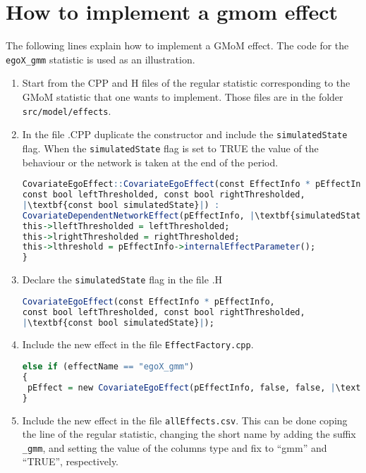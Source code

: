 \documentclass[a4paper,11pt]{article}
\begin{document}
\newpage
\section*{How to implement a gmom effect}
The following lines explain how to implement a GMoM effect. The code for the \texttt{egoX\_gmm} statistic is used as an illustration. 
\begin{enumerate}
	\item Start from the CPP and H files of the regular statistic corresponding to the GMoM statistic that one wants to implement. Those files are in the folder \texttt{src/model/effects}.
	\item In the file .CPP duplicate the constructor and include the \texttt{simulatedState} flag. When the \texttt{simulatedState} flag is set to TRUE the value of the behaviour or the network is taken at the end of the period.
	
\begin{lstlisting}[language=R]
CovariateEgoEffect::CovariateEgoEffect(const EffectInfo * pEffectInfo,
const bool leftThresholded, const bool rightThresholded,
|\textbf{const bool simulatedState}|) :
CovariateDependentNetworkEffect(pEffectInfo, |\textbf{simulatedState}|) {
this->lleftThresholded = leftThresholded;
this->lrightThresholded = rightThresholded;
this->lthreshold = pEffectInfo->internalEffectParameter();
}
\end{lstlisting}

\item Declare the \texttt{simulatedState} flag in the file .H
\begin{lstlisting}[language=R]
CovariateEgoEffect(const EffectInfo * pEffectInfo,
const bool leftThresholded, const bool rightThresholded,
|\textbf{const bool simulatedState}|);
\end{lstlisting}
\item Include the new effect in the file \texttt{EffectFactory.cpp}.
\begin{lstlisting}[language=R]
else if (effectName == "egoX_gmm")
{
 pEffect = new CovariateEgoEffect(pEffectInfo, false, false, |\textbf{true}|);
}
\end{lstlisting}
\item Include the new effect in the file \texttt{allEffects.csv}. This can be done coping the line of the regular statistic, changing the short name by adding the suffix \texttt{\_gmm}, and setting the value of the columns type and fix to ``gmm'' and ``TRUE'', respectively. 
\end{enumerate}
\end{document}
